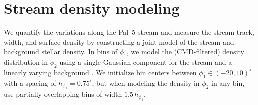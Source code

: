 \documentclass[twocolumn]{aastex62}
\begin{document}
\section{Stream density modeling}
\label{sec:densitymodel}

We quantify the variations along the Pal~5 stream and measure the stream track, width, and surface density by constructing a joint model of the stream and background stellar density.
In bins of $\phi_1$, we model the (CMD-filtered) density distribution in $\phi_2$ using a single Gaussian component for the stream and a linearly varying background \citep[similar to the density modeling described in][]{Price-Whelan:2018}.
We initialize bin centers between $\phi_1 \in (-20, 10)^\circ$ with a spacing of $h_{\phi_1} = 0.75^\circ$, but when modeling the density in $\phi_2$ in any bin, use partially overlapping bins of width $1.5\,h_{\phi_1}$.
\end{document}
